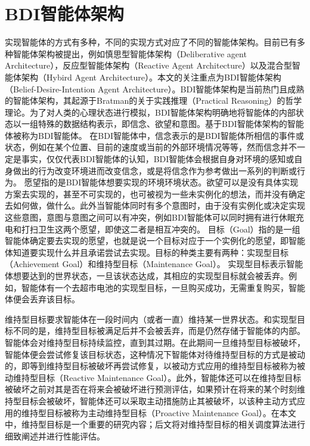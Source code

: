 \section{BDI智能体架构}
实现智能体的方式有多种，不同的实现方式对应了不同的智能体架构。目前已有多种智能体架构被提出，例如慎思型智能体架构（Deliberative agent Architecture），反应型智能体架构（Reactive Agent Architecture）以及混合型智能体架构（Hybird Agent Architecture）。本文的关注重点为BDI智能体架构（Belief-Desire-Intention Agent Architecture）。BDI智能体架构是当前热门且成熟的智能体架构，其起源于Bratman的关于实践推理（Practical Reasoning）的哲学理论\cite{bratman1987intention}。为了对人类的心理状态进行模拟，BDI智能体架构明确地将智能体的内部状态以一组特殊的数据结构表示，即信念、欲望和意图。基于BDI智能体架构的智能体被称为BDI智能体。
在BDI智能体中，信念表示的是BDI智能体所相信的事件或状态，例如在某个位置、目前的速度或当前的外部环境情况等等，然而信念并不一定是事实，仅仅代表BDI智能体的认知，BDI智能体会根据自身对环境的感知或自身做出的行为改变环境进而改变信念，或是将信念作为参考做出一系列的判断或行为。
愿望指的是BDI智能体想要实现的环境环境状态。欲望可以是没有具体实现方案去实现的，甚至不可实现的，也可被视为一些未实例化的想法，而并没有确定去如何做，做什么。此外当智能体同时有多个意图时，由于没有实例化或决定实现这些意图，意图与意图之间可以有冲突，例如BDI智能体可以同时拥有进行休眠充电和打扫卫生这两个愿望，即使这二者是相互冲突的。
目标（Goal）指的是一组智能体确定要去实现的愿望，也就是说一个目标对应于一个实例化的愿望，即智能体知道要实现什么并且承诺尝试去实现。目标的种类主要有两种：实现型目标（Achievement Goal）和维持型目标（Maintenance Goal）。
实现型目标表示智能体想要达到的世界状态，一旦该状态达成，其相应的实现型目标就会被丢弃。例如，智能体有一个去超市电池的实现型目标，一旦购买成功，无需重复购买，智能体便会丢弃该目标。

维持型目标要求智能体在一段时间内（或者一直）维持某一世界状态。和实现型目标不同的是，维持型目标被满足后并不会被丢弃，而是仍然存储于智能体的内部。智能体会对维持型目标持续监控，直到其过期。在此期间一旦维持型目标被破坏，智能体便会尝试修复该目标状态，这种情况下智能体对待维持型目标的方式是被动的，即等到维持型目标被破坏再尝试修复，以被动方式应用的维持型目标被称为被动维持型目标（Reactive Maintenance Goal）。此外，智能体还可以在维持型目标被破坏之前对其是否在将来会被破坏进行预测评估，如果预计在将来的某个时刻维持型目标会被破坏，智能体还可以采取主动措施防止其被破坏，以该种主动方式应用的维持型目标被称为主动维持型目标（Proactive Maintenance Goal）。在本文中，维持型目标是一个重要的研究内容；后文将对维持型目标的相关调度算法进行细致阐述并进行性能评估。

